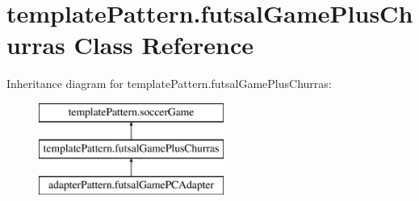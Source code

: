 \hypertarget{classtemplate_pattern_1_1futsal_game_plus_churras}{}\section{template\+Pattern.\+futsal\+Game\+Plus\+Churras Class Reference}
\label{classtemplate_pattern_1_1futsal_game_plus_churras}
Inheritance diagram for template\+Pattern.\+futsal\+Game\+Plus\+Churras\+:\begin{figure}[H]
\begin{center}
\leavevmode
\includegraphics[height=3.000000cm]{classtemplate_pattern_1_1futsal_game_plus_churras}
\end{center}
\end{figure}
